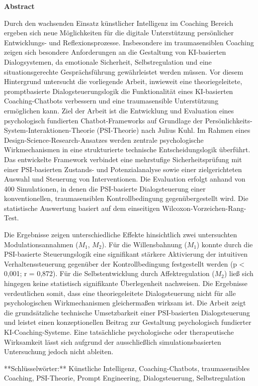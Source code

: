 \thispagestyle{empty}

\vspace*{1cm}

\begin{center}
    \textbf{Abstract}
\end{center}

\vspace*{1cm}

\noindent 
Durch den wachsenden Einsatz künstlicher Intelligenz im Coaching Bereich ergeben sich neue Möglichkeiten für die digitale Unterstützung persönlicher Entwicklungs- und Reflexionsprozesse. Insbesondere im traumasensiblen Coaching zeigen sich besondere Anforderungen an die Gestaltung von KI-basierten Dialogsystemen, da emotionale Sicherheit, Selbstregulation und eine situationsgerechte Gesprächsführung gewährleistet werden müssen. Vor diesem Hintergrund untersucht die vorliegende Arbeit, inwieweit eine theoriegeleitete, promptbasierte Dialogsteuerungslogik die Funktionalität eines KI-basierten Coaching-Chatbots verbessern und eine traumasensible Unterstützung ermöglichen kann.
Ziel der Arbeit ist die Entwicklung und Evaluation eines psychologisch fundierten Chatbot-Frameworks auf Grundlage der Persönlichkeits-System-Interaktionen-Theorie (PSI-Theorie) nach Julius Kuhl. Im Rahmen eines Design-Science-Research-Ansatzes werden zentrale psychologische Wirkmechanismen in eine strukturierte technische Entscheidungslogik überführt. Das entwickelte Framework verbindet eine mehrstufige Sicherheitsprüfung mit einer PSI-basierten Zustands- und Potenzialanalyse sowie einer zielgerichteten Auswahl und Steuerung von Interventionen. Die Evaluation erfolgt anhand von 400 Simulationen, in denen die PSI-basierte Dialogsteuerung einer konventionellen, traumasensiblen Kontrollbedingung gegenübergestellt wird. Die statistische Auswertung basiert auf dem einseitigen Wilcoxon-Vorzeichen-Rang-Test.

Die Ergebnisse zeigen unterschiedliche Effekte hinsichtlich zwei untersuchten Modulationsannahmen ($M_1$, $M_2$). Für die Willensbahnung ($M_1$) konnte durch die PSI-basierte Steuerungslogik eine signifikant stärkere Aktivierung der intuitiven Verhaltenssteuerung gegenüber der Kontrollbedingung festgestellt werden (p < 0,001; r = 0,872). Für die Selbstentwicklung durch Affektregulation ($M_2$) ließ sich hingegen keine statistisch signifikante Überlegenheit nachweisen. Die Ergebnisse verdeutlichen somit, dass eine theoriegeleitete Dialogsteuerung nicht für alle psychologischen Wirkmechanismen gleichermaßen wirksam ist.
Die Arbeit zeigt die grundsätzliche technische Umsetzbarkeit einer PSI-basierten Dialogsteuerung und leistet einen konzeptionellen Beitrag zur Gestaltung psychologisch fundierter KI-Coaching-Systeme. Eine tatsächliche psychologische oder therapeutische Wirksamkeit lässt sich aufgrund der ausschließlich simulationsbasierten Untersuchung jedoch nicht ableiten.

\vspace{0.5cm}

**Schlüsselwörter:** Künstliche Intelligenz, Coaching-Chatbots, traumasensibles Coaching, PSI-Theorie, Prompt Engineering, Dialogsteuerung, Selbstregulation
